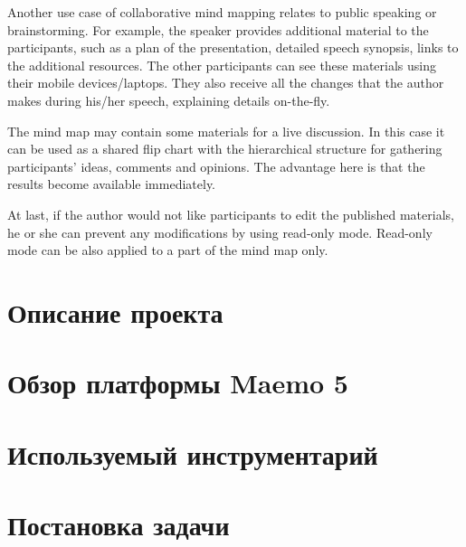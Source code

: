 
Another use case of collaborative mind mapping relates to public speaking or
brainstorming. For example, the speaker provides additional material to the
participants, such as a plan of the presentation, detailed speech synopsis,
links to the additional resources. The other participants can see these
materials using their mobile devices/laptops. They also receive all the changes
that the author makes during his/her speech, explaining details on-the-fly.

The mind map may contain some materials for a live discussion. In this case it
can be used as a shared flip chart with the hierarchical structure for gathering
participants' ideas, comments and opinions. The advantage here is that the
results become available immediately.

At last, if the author would not like participants to edit the published
materials, he or she can prevent any modifications by using read-only mode.
Read-only mode can be also applied to a part of the mind map only.

\section{Описание проекта}\label{sec:project_summary}

\section{Обзор платформы Maemo 5}\label{sec:compare_platforms}

\section{Используемый инструментарий}\label{sec:choose_toolkit}

\section{Постановка задачи}\label{sec:statement_task}
